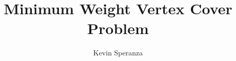 \documentclass[12pt,a4paper,openany,oneside]{book}
\begin{document}


\title{Minimum Weight Vertex Cover Problem}
\author{Kevin Speranza}

\tableofcontents





\newpage
{}
\end{document}
